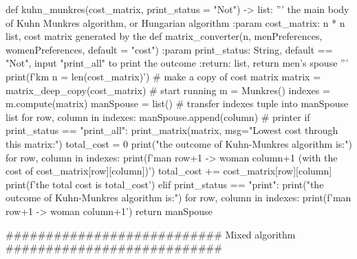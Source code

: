 \documentclass[14pt]{extarticle}
\begin{document}
\begin{python}
def kuhn_munkres(cost_matrix, print_status = "Not") -> list:
    '''
    the main body of Kuhn Munkres algorithm, or Hungarian algorithm
    :param cost_matrix: n * n list, cost matrix generated by the def matrix_converter(n, menPreferences, womenPreferences, default = "cost")
    :param print_status: String, default == "Not", input "print_all" to print the outcome
    :return: list, return men's spouse
    '''
    print(f'km n = {len(cost_matrix)}')
    # make a copy of cost matrix
    matrix = matrix_deep_copy(cost_matrix)
    # start running
    m = Munkres()
    indexes = m.compute(matrix)
    manSpouse = list()
    # transfer indexes tuple into manSpouse list
    for row, column in indexes:
        manSpouse.append(column)
    # printer    
    if print_status == "print_all":
        print_matrix(matrix, msg="Lowest cost through this matrix:")
        total_cost = 0
        print("the outcome of Kuhn-Munkres algorithm is:")
        for row, column in indexes:
            print(f'man {row+1} -> woman {column+1} (with the cost of {cost_matrix[row][column]})')
            total_cost += cost_matrix[row][column]
        print(f'the total cost is {total_cost}')    
    elif print_status == "print":
        print("the outcome of Kuhn-Munkres algorithm is:")
        for row, column in indexes:
            print(f'man {row+1} -> woman {column+1}')      
    return manSpouse

########################### Mixed algorithm ###########################


\end{python}
\end{document}
